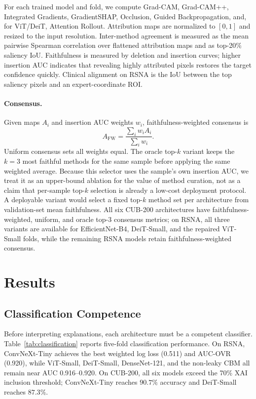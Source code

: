 \documentclass{bmvc2k}
\begin{document}
For each trained model and fold, we compute Grad-CAM, Grad-CAM++, Integrated Gradients, GradientSHAP, Occlusion, Guided Backpropagation, and, for ViT/DeiT, Attention Rollout. Attribution maps are normalized to $[0,1]$ and resized to the input resolution. Inter-method agreement is measured as the mean pairwise Spearman correlation over flattened attribution maps and as top-20\% saliency IoU. Faithfulness is measured by deletion and insertion curves; higher insertion AUC indicates that revealing highly attributed pixels restores the target confidence quickly. Clinical alignment on RSNA is the IoU between the top saliency pixels and an expert-coordinate ROI.

\paragraph{Consensus.}
Given maps $A_i$ and insertion AUC weights $w_i$, faithfulness-weighted consensus is
\begin{equation}
  A_{\mathrm{FW}} = \frac{\sum_i w_i A_i}{\sum_i w_i}.
\end{equation}
Uniform consensus sets all weights equal. The oracle top-$k$ variant keeps the $k=3$ most faithful methods for the same sample before applying the same weighted average. Because this selector uses the sample's own insertion AUC, we treat it as an upper-bound ablation for the value of method curation, not as a claim that per-sample top-$k$ selection is already a low-cost deployment protocol. A deployable variant would select a fixed top-$k$ method set per architecture from validation-set mean faithfulness. All six CUB-200 architectures have faithfulness-weighted, uniform, and oracle top-$3$ consensus metrics; on RSNA, all three variants are available for EfficientNet-B4, DeiT-Small, and the repaired ViT-Small folds, while the remaining RSNA models retain faithfulness-weighted consensus.

\section{Results}

\subsection{Classification Competence}

Before interpreting explanations, each architecture must be a competent classifier. Table~\ref{tab:classification} reports five-fold classification performance. On RSNA, ConvNeXt-Tiny achieves the best weighted log loss (0.511) and AUC-OVR (0.920), while ViT-Small, DeiT-Small, DenseNet-121, and the non-leaky CBM all remain near AUC 0.916--0.920. On CUB-200, all six models exceed the 70\% XAI inclusion threshold; ConvNeXt-Tiny reaches $90.7\%$ accuracy and DeiT-Small reaches $87.3\%$.
\end{document}
